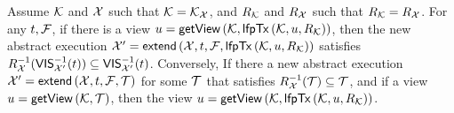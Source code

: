 \begin{theorem}
    \label{thm:view-vis-relation}
    Assume \( \mathcal{K} \) and \( \mathcal{X} \) such that \( \mathcal{K} = \mathcal{K}_{\mathcal{X}} \), 
    and \( R_{\mathcal{K}} \) and \( R_{\mathcal{X}} \) such that \( R_{\mathcal{K}} = R_{\mathcal{X}} \).
    For any \(t, \mathcal{F} \),
    if there is a view \( \vi = \getView[\mkvs,\lfpTx[\mkvs,\vi,\rel_\mkvs]] \),
    then the new abstract execution \( \aexec' = \extend[\aexec, \txid, \fp, \lfpTx[\mkvs,\vi,\rel_\mkvs]] \)
    satisfies \( R_{\mathcal{X}}^{-1}(\mathsf{VIS}_{\mathcal{X}'}^{-1}(t)) \subseteq \mathsf{VIS}_{\mathcal{X}'}^{-1}(t) \).
    Conversely,
    If there a new abstract execution \( \aexec' = \extend[\aexec, \txid, \fp, \txidset] \) for some \( \mathcal{T} \)
    that satisfies \( R_{\mathcal{X}}^{-1}(\mathcal{T}) \subseteq \mathcal{T} \),
    and if a view \( \vi = \getView[\mkvs,\txidset] \),
    then the view \( \vi = \getView[\mkvs,\lfpTx[\mkvs,\vi,\rel_\mkvs]] \).
\end{theorem}
